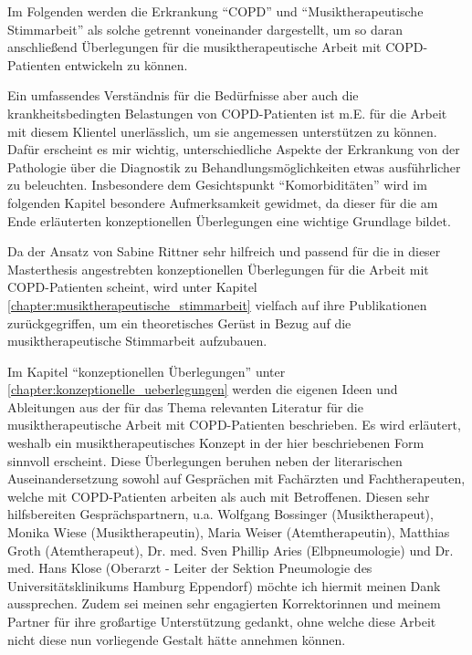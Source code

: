 Im Folgenden werden die Erkrankung "`COPD"' und "`Musiktherapeutische Stimmarbeit"' als solche getrennt voneinander dargestellt, um so daran anschließend Überlegungen für die musiktherapeutische Arbeit mit COPD-Patienten entwickeln zu können.

Ein umfassendes Verständnis für die Bedürfnisse aber auch die krankheitsbedingten Belastungen von COPD-Patienten ist m.E. für die Arbeit mit diesem Klientel unerlässlich, um sie angemessen unterstützen zu können. Dafür erscheint es mir wichtig, unterschiedliche Aspekte der Erkrankung von der Pathologie über die Diagnostik zu Behandlungsmöglichkeiten etwas ausführlicher zu beleuchten. Insbesondere dem Gesichtspunkt "`Komorbiditäten"' wird im folgenden Kapitel besondere Aufmerksamkeit gewidmet, da dieser für die am Ende erläuterten konzeptionellen Überlegungen eine wichtige Grundlage bildet.

Da der Ansatz von Sabine Rittner sehr hilfreich und passend für die in dieser Masterthesis angestrebten konzeptionellen Überlegungen für die Arbeit mit COPD-Patienten scheint, wird unter Kapitel  \ref{chapter:musiktherapeutische_stimmarbeit} vielfach auf ihre Publikationen zurückgegriffen, um ein theoretisches Gerüst in Bezug auf die musiktherapeutische Stimmarbeit aufzubauen.

Im Kapitel "`konzeptionellen Überlegungen"' unter \ref{chapter:konzeptionelle_ueberlegungen} werden die eigenen Ideen und Ableitungen aus der für das Thema relevanten Literatur für die musiktherapeutische Arbeit mit COPD-Patienten beschrieben. Es wird erläutert, weshalb ein musiktherapeutisches Konzept in der hier beschriebenen Form sinnvoll erscheint. Diese Überlegungen beruhen neben der literarischen Auseinandersetzung sowohl auf Gesprächen mit Fachärzten und Fachtherapeuten, welche mit COPD-Patienten arbeiten als auch mit Betroffenen. Diesen sehr hilfsbereiten Gesprächspartnern, u.a. Wolfgang Bossinger (Musiktherapeut), Monika Wiese (Musiktherapeutin), Maria Weiser (Atemtherapeutin), Matthias Groth (Atemtherapeut), Dr. med. Sven Phillip Aries (Elbpneumologie) und Dr. med. Hans Klose (Oberarzt - Leiter der Sektion Pneumologie des Universitätsklinikums Hamburg Eppendorf) möchte ich hiermit meinen Dank aussprechen. Zudem sei meinen sehr engagierten Korrektorinnen und meinem Partner für ihre großartige Unterstützung gedankt, ohne welche diese Arbeit nicht diese nun vorliegende Gestalt hätte annehmen können.

\newpage\thispagestyle{empty}